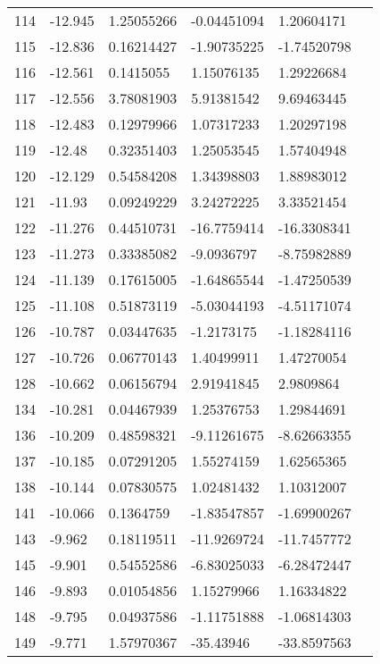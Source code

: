 \begin{longtable}{XXXXXX}
    114   & -12.945 & 1.25055266 & -0.04451094 & 1.20604171 &  \\
    115   & -12.836 & 0.16214427 & -1.90735225 & -1.74520798 &  \\
    116   & -12.561 & 0.1415055 & 1.15076135 & 1.29226684 &  \\
    117   & -12.556 & 3.78081903 & 5.91381542 & 9.69463445 &  \\
    118   & -12.483 & 0.12979966 & 1.07317233 & 1.20297198 &  \\
    119   & -12.48 & 0.32351403 & 1.25053545 & 1.57404948 &  \\
    120   & -12.129 & 0.54584208 & 1.34398803 & 1.88983012 &  \\
    121   & -11.93 & 0.09249229 & 3.24272225 & 3.33521454 &  \\
    122   & -11.276 & 0.44510731 & -16.7759414 & -16.3308341 &  \\
    123   & -11.273 & 0.33385082 & -9.0936797 & -8.75982889 &  \\
    124   & -11.139 & 0.17615005 & -1.64865544 & -1.47250539 &  \\
    125   & -11.108 & 0.51873119 & -5.03044193 & -4.51171074 &  \\
    126   & -10.787 & 0.03447635 & -1.2173175 & -1.18284116 &  \\
    127   & -10.726 & 0.06770143 & 1.40499911 & 1.47270054 &  \\
    128   & -10.662 & 0.06156794 & 2.91941845 & 2.9809864 &  \\
    134   & -10.281 & 0.04467939 & 1.25376753 & 1.29844691 &  \\
    136   & -10.209 & 0.48598321 & -9.11261675 & -8.62663355 &  \\
    137   & -10.185 & 0.07291205 & 1.55274159 & 1.62565365 &  \\
    138   & -10.144 & 0.07830575 & 1.02481432 & 1.10312007 &  \\
    141   & -10.066 & 0.1364759 & -1.83547857 & -1.69900267 &  \\
    143   & -9.962 & 0.18119511 & -11.9269724 & -11.7457772 &  \\
    145   & -9.901 & 0.54552586 & -6.83025033 & -6.28472447 &  \\
    146   & -9.893 & 0.01054856 & 1.15279966 & 1.16334822 &  \\
    148   & -9.795 & 0.04937586 & -1.11751888 & -1.06814303 &  \\
    149   & -9.771 & 1.57970367 & -35.43946 & -33.8597563 &  \\

\end{longtable}
